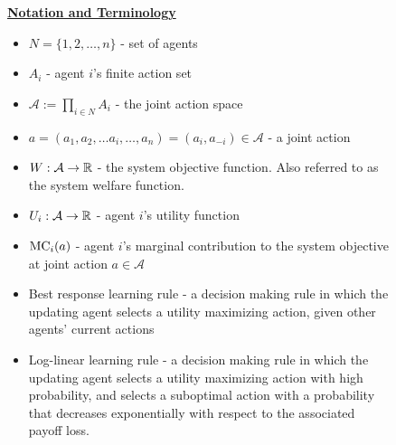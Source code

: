 \begin{figure}
\vspace{.15in}
\begin{mdframed}
\underline{\textbf{Notation and Terminology}}
\begin{itemize}
    \item $N = \{1,2,\ldots,n\}$ - set of agents
    \item $A_i$ - agent $i$'s finite action set
    \item $\mathcal{A}:=\prod_{i\in N} A_i$ - the joint action space
    \item $a = (a_1,a_2,\ldots a_i,\ldots,a_n) = (a_i,a_{-i})\in\mathcal{A}$ - a joint action
    \item $W:\mathcal{A}\to\mathbb{R}$ - the system objective function. Also referred to as the system welfare function.
    \item $U_i:\mathcal{A}\to\mathbb{R}$ - agent $i$'s utility function
    \item ${\rm MC}_i(a)$ - agent $i$'s marginal contribution to the system objective at joint action $a\in \mathcal{A}$
    \item Best response learning rule - a decision making rule in which the updating agent selects a utility maximizing action, given other agents' current actions
    \item Log-linear learning rule - a decision making rule in which the updating agent selects a utility maximizing action with high probability, and selects a suboptimal action with a probability that decreases exponentially with respect to the associated payoff loss.
\end{itemize}
\end{mdframed}
\end{figure}



